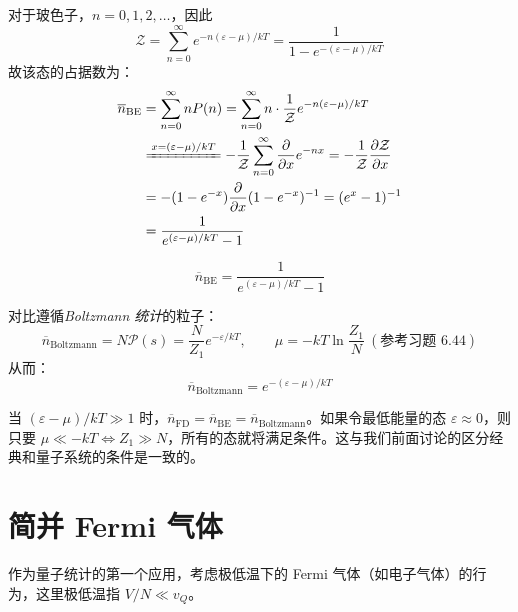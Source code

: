对于玻色子，$n=0,1,2,\dots$，因此
\begin{equation}
\mathcal{Z}=\sum_{n=0}^{\infty}e^{-n(\varepsilon-\mu)/kT}
=\frac{1}{1-e^{-(\varepsilon-\mu)/kT}}
\end{equation}
故该态的占据数为：
\begin{equation}
    \begin{split}
        \overline n_{\mathrm{BE}}
        &=\sum_{n=0}^{\infty} nP(n)
        =\sum_{n=0}^{\infty} n\cdot\frac{1}{\mathcal{Z}}e^{-n(\varepsilon-\mu)/kT}\\
        &\xlongequal{x=(\varepsilon-\mu)/kT}-\frac{1}{\mathcal{Z}}\sum_{n=0}^{\infty}\frac{\partial}{\partial x}e^{-nx}
        =-\frac{1}{\mathcal{Z}}\frac{\partial \mathcal{Z}}{\partial x}\\
        &=-(1-e^{-x})\frac{\partial}{\partial x}(1-e^{-x})^{-1}
        =(e^{x}-1)^{-1}\\
        &=\frac{1}{e^{(\varepsilon-\mu)/kT}-1}
    \end{split}
\end{equation}
\begin{definition}
    \begin{equation}
        \overline n_{\mathrm{BE}} = \frac{1}{e^{(\varepsilon-\mu)/kT}-1}
    \end{equation}
\end{definition}

对比遵循\textit{Boltzmann 统计}的粒子：
\begin{equation}
\overline n_{\mathrm{Boltzmann}}=N\mathcal{P}(s)=\frac{N}{Z_1}e^{-\varepsilon/kT},
\qquad
\mu=-kT\ln\frac{Z_1}{N}\ (\text{参考习题 6.44})
\end{equation}
从而：
\begin{equation}
\overline n_{\mathrm{Boltzmann}}=e^{-(\varepsilon-\mu)/kT}
\end{equation}



当 $(\varepsilon-\mu)/kT\gg 1$ 时，$\overline n_{\mathrm{FD}}=\overline n_{\mathrm{BE}}=\overline n_{\mathrm{Boltzmann}}$。如果令最低能量的态 $\varepsilon \approx 0$，则只要 $\mu \ll -kT \iff Z_1 \gg N$，所有的态就将满足条件。这与我们前面讨论的区分经典和量子系统的条件是一致的。

\section{简并 Fermi 气体}
作为量子统计的第一个应用，考虑极低温下的 Fermi 气体（如电子气体）的行为，这里极低温指 $V/N\ll v_Q$。

